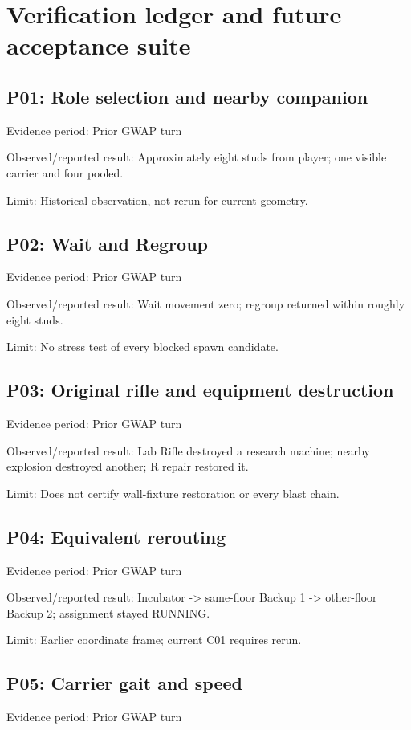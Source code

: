 \chapter{Verification ledger and future acceptance suite}
\section{P01: Role selection and nearby companion}
Evidence period: Prior GWAP turn

Observed/\allowbreak{}reported result: Approximately eight studs from player; one visible carrier and four pooled.\allowbreak{}

Limit: Historical observation, not rerun for current geometry.\allowbreak{}

\section{P02: Wait and Regroup}
Evidence period: Prior GWAP turn

Observed/\allowbreak{}reported result: Wait movement zero; regroup returned within roughly eight studs.\allowbreak{}

Limit: No stress test of every blocked spawn candidate.\allowbreak{}

\section{P03: Original rifle and equipment destruction}
Evidence period: Prior GWAP turn

Observed/\allowbreak{}reported result: Lab Rifle destroyed a research machine; nearby explosion destroyed another; R repair restored it.\allowbreak{}

Limit: Does not certify wall-fixture restoration or every blast chain.\allowbreak{}

\section{P04: Equivalent rerouting}
Evidence period: Prior GWAP turn

Observed/\allowbreak{}reported result: Incubator -> same-floor Backup 1 -> other-floor Backup 2; assignment stayed RUNNING.\allowbreak{}

Limit: Earlier coordinate frame; current C01 requires rerun.\allowbreak{}

\section{P05: Carrier gait and speed}
Evidence period: Prior GWAP turn

